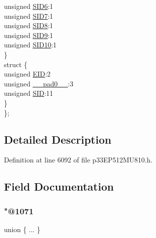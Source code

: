 \begin{DoxyCompactItemize}
\begin{tabbing}
\>\>unsigned \hyperlink{structtag_c2_r_x_m2_s_i_d_b_i_t_s_a70d70952133eb2389d5c326f9f0e8035}{SID6}:1\\
\>\>unsigned \hyperlink{structtag_c2_r_x_m2_s_i_d_b_i_t_s_a34097fb76decd431701fa2d86a22328e}{SID7}:1\\
\>\>unsigned \hyperlink{structtag_c2_r_x_m2_s_i_d_b_i_t_s_afe74894633244fdb0b0c01b4e8c522e7}{SID8}:1\\
\>\>unsigned \hyperlink{structtag_c2_r_x_m2_s_i_d_b_i_t_s_a33587704948067005c2a6a3ccc503c99}{SID9}:1\\
\>\>unsigned \hyperlink{structtag_c2_r_x_m2_s_i_d_b_i_t_s_a1a9084031c7f5fb16007feeebf0d8216}{SID10}:1\\
\>\} \\
\>struct \{\\
\>\>unsigned \hyperlink{structtag_c2_r_x_m2_s_i_d_b_i_t_s_ae80b378c9141f7c03e0b4e55b5f4b54d}{EID}:2\\
\>\>unsigned \hyperlink{structtag_c2_r_x_m2_s_i_d_b_i_t_s_adf71f3d8410c1f1dbbc96680a92c49af}{\_\_pad0\_\_}:3\\
\>\>unsigned \hyperlink{structtag_c2_r_x_m2_s_i_d_b_i_t_s_af88edf93b2fee2432665bd84f51287e4}{SID}:11\\
\>\} \\
\}; \\

\end{tabbing}\end{DoxyCompactItemize}


\subsection{Detailed Description}


Definition at line 6092 of file p33\+E\+P512\+M\+U810.\+h.



\subsection{Field Documentation}
\mbox{\label{structtag_c2_r_x_m2_s_i_d_b_i_t_s_adff6548e3c220107314b20c4d848d4db}} 
\subsubsection{\texorpdfstring{"@1071}{@1071}}
{\footnotesize\ttfamily union \{ ... \} }

\mbox{\label{structtag_c2_r_x_m2_s_i_d_b_i_t_s_adf71f3d8410c1f1dbbc96680a92c49af}} 
